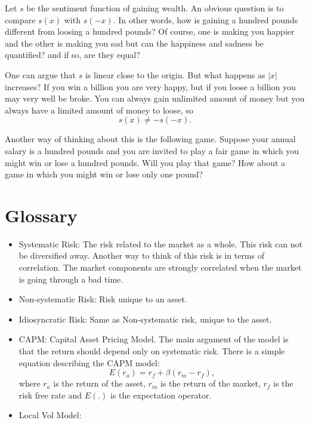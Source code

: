 \documentclass{amsart}
\theoremstyle{plain}
\numberwithin{equation}{section}
\begin{document}
Let $s$ be the sentiment function of 
gaining wealth. An obvious question is
to compare $s(x)$ with $s(-x)$. In other words,
how is gaining a hundred pounds different from 
loosing a hundred pounds? Of course, one is making 
you happier and the other is making you sad but 
can the happiness and sadness be quantified? and 
if so, are they equal?

One can argue that $s$ is linear close to the 
origin. But what happens as $|x|$ increases?
If you win a billion you are very happy, but if you 
loose a billion you may very well be broke. You can 
always gain unlimited amount of money but you always 
have a limited amount of money to loose, so 
\begin{equation}
s(x) \neq -s(-x).
\end{equation}

Another way of thinking about this is the following 
game. Suppose your annual salary is a hundred pounds
and you are invited to play a fair game in which you 
might win or lose a hundred pounds. Will you play that 
game? How about a game in which you might win or lose 
only one pound?

\section{Glossary}
\begin{itemize}
\item Systematic Risk: The risk related to the market as a whole. This 
risk can not be diversified away. Another way to think of this risk 
is in terms of correlation. The market components are strongly correlated
when the market is going through a bad time.
\item Non-systematic Risk: Risk unique to an asset.
\item Idiosyncratic Risk: Same as Non-systematic risk, unique to the asset.
\item CAPM: Capital Asset Pricing Model. The main argument of the model is that 
the return should depend only on systematic risk. There is a simple 
equation describing the CAPM model:
\begin{equation}
E(r_a) = r_f + \beta( r_m - r_f ),
\label{eq:capm}
\end{equation}
where $r_a$ is the return of the asset,
$r_m$ is the return of the market, 
$r_f$ is the risk free rate and $E(.)$ is 
the expectation operator. 
	
\item Local Vol Model: 
\end{itemize}
\end{document}
